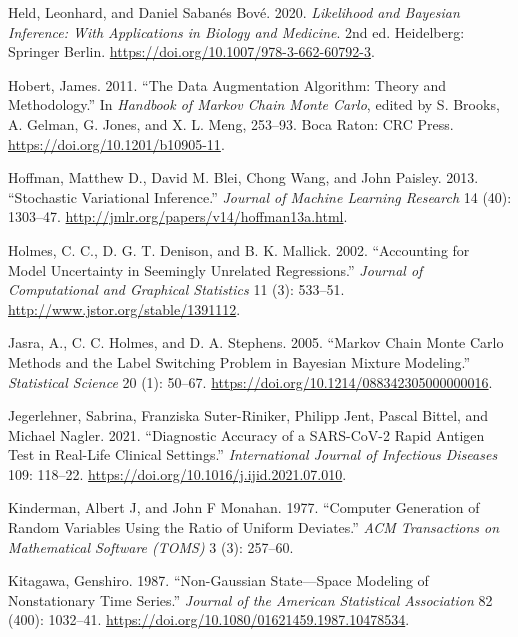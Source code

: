 \documentclass[
  11pt,
  letterpaper,
]{scrbook}
\newlength{\cslhangindent}
\newenvironment{CSLReferences}[2] %
 {\begin{list}{}{%
  \setlength{\itemindent}{0pt}
  \setlength{\leftmargin}{0pt}
  \setlength{\parsep}{0pt}
  \ifodd #1
   \setlength{\leftmargin}{\cslhangindent}
   \setlength{\itemindent}{-1\cslhangindent}
  \fi
  \setlength{\itemsep}{#2\baselineskip}}}
 {\end{list}}
\theoremstyle{definition}
\theoremstyle{definition}
\theoremstyle{definition}
\theoremstyle{plain}
\theoremstyle{plain}
\theoremstyle{plain}
\theoremstyle{remark}
\begin{document}
\begin{CSLReferences}{1}{0}
Held, Leonhard, and Daniel Sabanés Bové. 2020. \emph{Likelihood and
{B}ayesian Inference: With Applications in Biology and Medicine}. 2nd
ed. Heidelberg: Springer Berlin.
\url{https://doi.org/10.1007/978-3-662-60792-3}.

Hobert, James. 2011. {``The Data Augmentation Algorithm: Theory and
Methodology.''} In \emph{Handbook of {M}arkov Chain {M}onte {C}arlo},
edited by S. Brooks, A. Gelman, G. Jones, and X. L. Meng, 253--93. Boca
Raton: CRC Press. \url{https://doi.org/10.1201/b10905-11}.

Hoffman, Matthew D., David M. Blei, Chong Wang, and John Paisley. 2013.
{``Stochastic Variational Inference.''} \emph{Journal of Machine
Learning Research} 14 (40): 1303--47.
\url{http://jmlr.org/papers/v14/hoffman13a.html}.

Holmes, C. C., D. G. T. Denison, and B. K. Mallick. 2002. {``Accounting
for Model Uncertainty in Seemingly Unrelated Regressions.''}
\emph{Journal of Computational and Graphical Statistics} 11 (3):
533--51. \url{http://www.jstor.org/stable/1391112}.

Jasra, A., C. C. Holmes, and D. A. Stephens. 2005. {``{M}arkov Chain
{M}onte {C}arlo Methods and the Label Switching Problem in {B}ayesian
Mixture Modeling.''} \emph{Statistical Science} 20 (1): 50--67.
\url{https://doi.org/10.1214/088342305000000016}.

Jegerlehner, Sabrina, Franziska Suter-Riniker, Philipp Jent, Pascal
Bittel, and Michael Nagler. 2021. {``Diagnostic Accuracy of a
{SARS-CoV-2} Rapid Antigen Test in Real-Life Clinical Settings.''}
\emph{International Journal of Infectious Diseases} 109: 118--22.
\url{https://doi.org/10.1016/j.ijid.2021.07.010}.

Kinderman, Albert J, and John F Monahan. 1977. {``Computer Generation of
Random Variables Using the Ratio of Uniform Deviates.''} \emph{ACM
Transactions on Mathematical Software (TOMS)} 3 (3): 257--60.

Kitagawa, Genshiro. 1987. {``Non-{G}aussian State---Space Modeling of
Nonstationary Time Series.''} \emph{Journal of the American Statistical
Association} 82 (400): 1032--41.
\url{https://doi.org/10.1080/01621459.1987.10478534}.


\end{CSLReferences}
\end{document}
